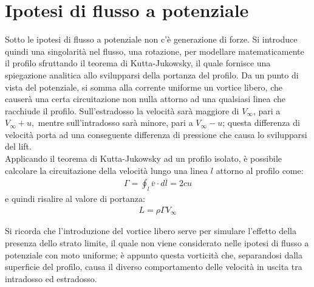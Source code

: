 \section{Ipotesi di flusso a potenziale}
Sotto le ipotesi di flusso a potenziale non c'è generazione di forze. Si introduce quindi una singolarità nel flusso, una rotazione, per modellare matematicamente il profilo sfruttando il teorema di Kutta-Jukowsky, il quale fornisce una spiegazione analitica allo svilupparsi della portanza del profilo. Da un punto di vista del potenziale, si somma alla corrente uniforme un vortice libero, che causerà una certa circuitazione non nulla attorno ad una qualsiasi linea che racchiude il profilo. Sull'estradosso la velocità sarà maggiore di $V_{\infty}$, pari a $V_{\infty}+u,$ mentre sull'intradosso sarà minore, pari a $V_{\infty}-u$; questa differenza di velocità porta ad una conseguente differenza di pressione che causa lo svilupparsi del lift.\\
Applicando il teorema di Kutta-Jukowsky ad un profilo isolato, è possibile calcolare la circuitazione della velocità lungo una linea $l$ attorno al profilo come:
\begin{align*}
\Gamma = \oint_l \overline{v} \cdot d \overline{l} = 2cu
\end{align*}
e quindi risalire al valore di portanza:
\begin{align*}
L=\rho \Gamma V_\infty
\end{align*}

Si ricorda che l'introduzione del vortice libero serve per simulare l'effetto della presenza dello strato limite, il quale non viene considerato nelle ipotesi di flusso a potenziale con moto uniforme; è appunto questa vorticità che, separandosi dalla superficie del profilo, causa il diverso comportamento delle velocità in uscita tra intradosso ed estradosso.

